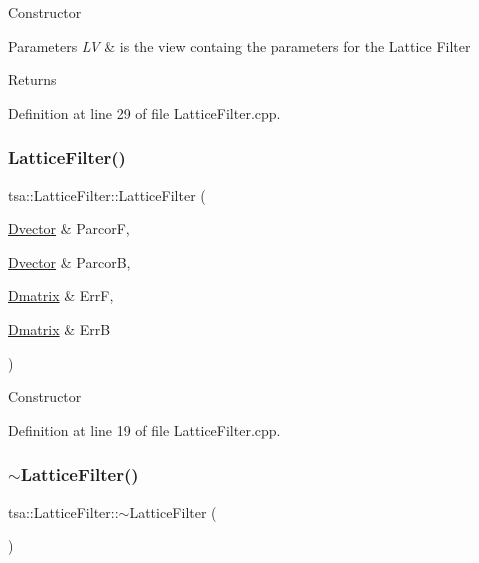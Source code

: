 Constructor


\begin{DoxyParams}{Parameters}
{\em LV} & is the view containg the parameters for the Lattice Filter \\
\hline
\end{DoxyParams}
\begin{DoxyReturn}{Returns}

\end{DoxyReturn}


Definition at line 29 of file Lattice\+Filter.\+cpp.

\mbox{\label{classtsa_1_1_lattice_filter_af2e6c3e8d7fb7399f564f47c060bccc3}} 
\subsubsection{\texorpdfstring{Lattice\+Filter()}{LatticeFilter()}\hspace{0.1cm}{\footnotesize\ttfamily [2/2]}}
{\footnotesize\ttfamily tsa\+::\+Lattice\+Filter\+::\+Lattice\+Filter (\begin{DoxyParamCaption}\item[{\hyperlink{namespacetsa_a8900fb03d849baf447a1a0efe2561fb2}{Dvector} \&}]{ParcorF,  }\item[{\hyperlink{namespacetsa_a8900fb03d849baf447a1a0efe2561fb2}{Dvector} \&}]{ParcorB,  }\item[{\hyperlink{namespacetsa_ad260cd21c1891c4ed391fe788569aba4}{Dmatrix} \&}]{ErrF,  }\item[{\hyperlink{namespacetsa_ad260cd21c1891c4ed391fe788569aba4}{Dmatrix} \&}]{ErrB }\end{DoxyParamCaption})}

Constructor 

Definition at line 19 of file Lattice\+Filter.\+cpp.

\mbox{\label{classtsa_1_1_lattice_filter_a8a7c4763fe464837766a5beff88d36d5}} 
\subsubsection{\texorpdfstring{$\sim$\+Lattice\+Filter()}{~LatticeFilter()}}
{\footnotesize\ttfamily tsa\+::\+Lattice\+Filter\+::$\sim$\+Lattice\+Filter (\begin{DoxyParamCaption}{ }\end{DoxyParamCaption})\hspace{0.3cm}{\ttfamily [virtual]}}


